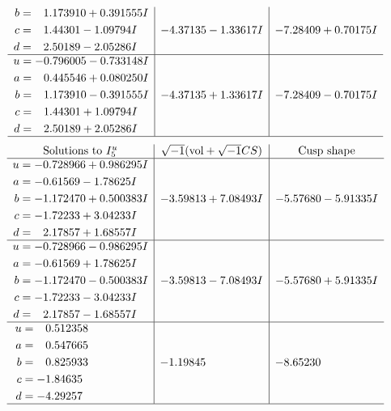 \documentclass[1p]{elsarticle_modified}
\theoremstyle{definition}
\newcommand{\I}{\sqrt{-1}}
\begin{document}
$$\begin{array}{c|c|c}
\begin{aligned}
b &= \phantom{-}1.173910 + 0.391555 I \\
c &= \phantom{-}1.44301 - 1.09794 I \\
d &= \phantom{-}2.50189 - 2.05286 I\end{aligned}
 & -4.37135 - 1.33617 I & -7.28409 + 0.70175 I \\ \hline\begin{aligned}
u &= -0.796005 - 0.733148 I \\
a &= \phantom{-}0.445546 + 0.080250 I \\
b &= \phantom{-}1.173910 - 0.391555 I \\
c &= \phantom{-}1.44301 + 1.09794 I \\
d &= \phantom{-}2.50189 + 2.05286 I\end{aligned}
 & -4.37135 + 1.33617 I & -7.28409 - 0.70175 I\\
 \hline 
 \end{array}$$\newpage$$\begin{array}{c|c|c}  
\text{Solutions to }I^u_{5}& \I (\text{vol} + \sqrt{-1}CS) & \text{Cusp shape}\\
 \hline 
\begin{aligned}
u &= -0.728966 + 0.986295 I \\
a &= -0.61569 - 1.78625 I \\
b &= -1.172470 + 0.500383 I \\
c &= -1.72233 + 3.04233 I \\
d &= \phantom{-}2.17857 + 1.68557 I\end{aligned}
 & -3.59813 + 7.08493 I & -5.57680 - 5.91335 I \\ \hline\begin{aligned}
u &= -0.728966 - 0.986295 I \\
a &= -0.61569 + 1.78625 I \\
b &= -1.172470 - 0.500383 I \\
c &= -1.72233 - 3.04233 I \\
d &= \phantom{-}2.17857 - 1.68557 I\end{aligned}
 & -3.59813 - 7.08493 I & -5.57680 + 5.91335 I \\ \hline\begin{aligned}
u &= \phantom{-}0.512358\phantom{ +0.000000I} \\
a &= \phantom{-}0.547665\phantom{ +0.000000I} \\
b &= \phantom{-}0.825933\phantom{ +0.000000I} \\
c &= -1.84635\phantom{ +0.000000I} \\
d &= -4.29257\phantom{ +0.000000I}\end{aligned}
 & -1.19845\phantom{ +0.000000I} & -8.65230\phantom{ +0.000000I}\\
 \hline 
 \end{array}$$\newpage\newpage\renewcommand{\arraystretch}{1}
\end{document}
